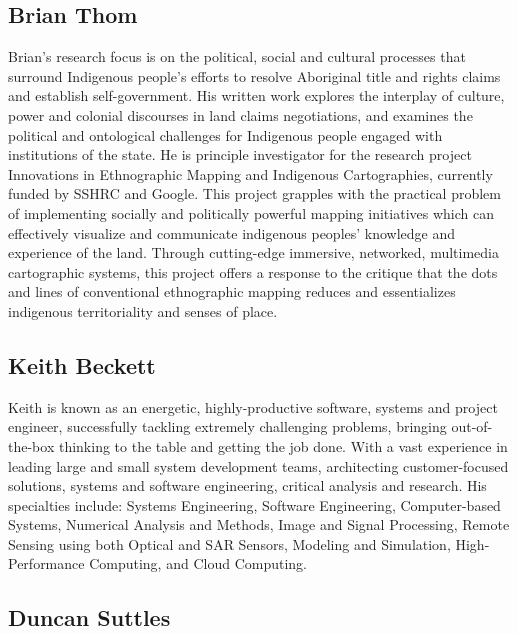\subsection*{Brian Thom}
Brian’s research focus is on the political, social and cultural processes that surround Indigenous people's efforts to resolve Aboriginal title and rights claims and establish self-government.  His written work explores the interplay of culture, power and colonial discourses in land claims negotiations, and examines the political and ontological challenges for Indigenous people engaged with institutions of the state.  He is principle investigator for the research project Innovations in Ethnographic Mapping and Indigenous Cartographies, currently funded by SSHRC and Google. This project grapples with the practical problem of implementing socially and politically powerful mapping initiatives which can effectively visualize and communicate indigenous peoples’ knowledge and experience of the land. Through cutting-edge immersive, networked, multimedia cartographic systems, this project offers a response to the critique that the dots and lines of conventional ethnographic mapping reduces and essentializes indigenous territoriality and senses of place.



\subsection*{Keith Beckett}
Keith is known as an energetic, highly-productive software, systems and project engineer, successfully tackling extremely challenging problems, bringing out-of-the-box thinking to the table and getting the job done. With a vast experience in leading large and small system development teams, architecting customer-focused solutions, systems and software engineering, critical analysis and research.  His specialties include: Systems Engineering, Software Engineering, Computer-based Systems, Numerical Analysis and Methods, Image and Signal Processing, Remote Sensing using both Optical and SAR Sensors, Modeling and Simulation, High-Performance Computing, and Cloud Computing.

\subsection*{Duncan Suttles}
